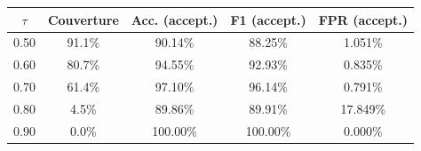 \begin{tabular}{ccccc}
\toprule
$\tau$ & Couverture & Acc. (accept.) & F1 (accept.) & FPR (accept.) \\
\midrule
0.50 & 91.1\% & 90.14\% & 88.25\% & 1.051\% \\
0.60 & 80.7\% & 94.55\% & 92.93\% & 0.835\% \\
0.70 & 61.4\% & 97.10\% & 96.14\% & 0.791\% \\
0.80 & 4.5\% & 89.86\% & 89.91\% & 17.849\% \\
0.90 & 0.0\% & 100.00\% & 100.00\% & 0.000\% \\
\bottomrule
\end{tabular}